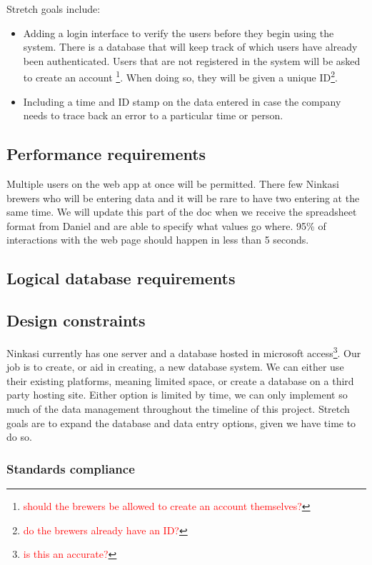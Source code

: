 \documentclass[draftclsnofoot,onecolumn,letterpaper,10pt,compsoc]{IEEEtran}
\newcommand\question[1]{\footnote{\textcolor{red}{#1}}}
\begin{document}
	Stretch goals include:
\begin{itemize}
	\item{Adding a login interface to verify the users before they begin using the system. There is a database that will keep track of which users have already been authenticated. Users that are not registered in the system will be asked to create an account \question{should the brewers be allowed to create an account themselves?}. When doing so, they will be given a unique ID\question{do the brewers already have an ID?}.}

	\item{Including a time and ID stamp on the data entered in case the company needs to trace back an error to a particular time or person.}
\end{itemize}

	\subsection{Performance requirements}

	Multiple users on the web app at once will be permitted. There few Ninkasi brewers who will be entering data and it will be rare to have two entering at the same time. We will update this part of the doc when we receive the spreadsheet format from Daniel and are able to specify what values go where. 95\% of interactions with the web page should happen in less than 5 seconds.

	\subsection{Logical database requirements}



	\subsection{Design constraints}
	Ninkasi currently has one server and a database hosted in microsoft access\question{is this an accurate?}. Our job is to create, or aid in creating, a new database system. We can either use their existing platforms, meaning limited space, or create a database on a third party hosting site. Either option is limited by time, we can only implement so much of the data management throughout the timeline of this project. Stretch goals are to expand the database and data entry options, given we have time to do so.

		\subsubsection{Standards compliance}
\end{document}

